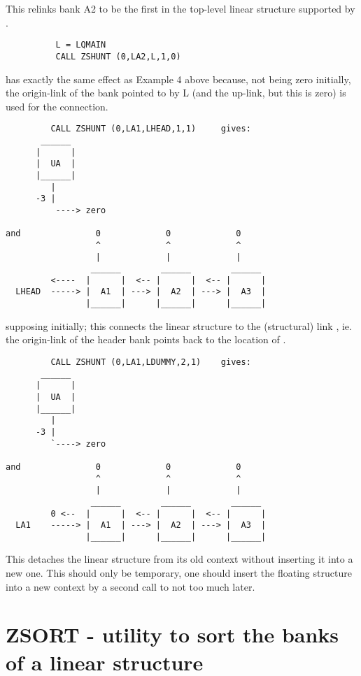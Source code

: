 This relinks bank A2 to be the first in the top-level linear
structure supported by .

\begin{verbatim}
          L = LQMAIN
          CALL ZSHUNT (0,LA2,L,1,0)
\end{verbatim} 
has exactly the same effect as Example 4 above because,
 not being zero initially,
the origin-link of the bank pointed to by L
(and the up-link, but this is zero)
is used for the connection.


\begin{verbatim}
         CALL ZSHUNT (0,LA1,LHEAD,1,1)     gives:
       ______
      |      |
      |  UA  |
      |______|
         |
      -3 |
          ----> zero

and               0             0             0
                  ^             ^             ^
                  |             |             |
                 ______        ______        ______
         <----  |      |  <-- |      |  <-- |      |
  LHEAD  -----> |  A1  | ---> |  A2  | ---> |  A3  |
                |______|      |______|      |______|
\end{verbatim} 

supposing  initially; this connects the linear structure
to the (structural) link , ie. the origin-link of the header bank 
points back to the location of .

\begin{verbatim}
         CALL ZSHUNT (0,LA1,LDUMMY,2,1)    gives:
       ______
      |      |
      |  UA  |
      |______|
         |
      -3 |
         `----> zero

and               0             0             0
                  ^             ^             ^
                  |             |             |
                 ______        ______        ______
         0 <--  |      |  <-- |      |  <-- |      |
  LA1    -----> |  A1  | ---> |  A2  | ---> |  A3  |
                |______|      |______|      |______|
\end{verbatim} 
This detaches the linear structure from its old context
without inserting it into a new one.
This should only be temporary, one should insert the floating
structure into a new context by a second call to 
not too much later.

\section{ZSORT  - utility to sort the banks of a linear structure}

